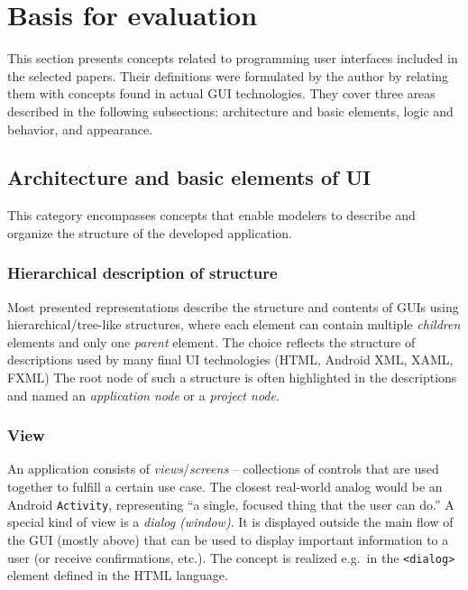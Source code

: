 \section{Basis for evaluation}\label{sec:basis-for-evaluation}

This section presents concepts related to programming user interfaces included in the selected papers.
Their definitions were formulated by the author by relating them with concepts found in actual GUI technologies.
They cover three areas described in the following subsections: architecture and basic elements, logic and behavior, and appearance.

\subsection{Architecture and basic elements of UI}\label{subsec:architecture-and-basic-elements-of-ui}
This category encompasses concepts that enable modelers to describe and organize the structure of the developed application.

\subsubsection{Hierarchical description of structure}
Most presented representations describe the structure and contents of GUIs using hierarchical/tree-like structures, where each element can contain multiple \emph{children} elements and only one \emph{parent} element.
The choice reflects the structure of descriptions used by many final UI technologies (HTML, Android XML, XAML, FXML)
The root node of such a structure is often highlighted in the descriptions and named an \emph{application node} or a \emph{project node}.

\subsubsection{View}
An application consists of \emph{views}/\emph{screens} -- collections of controls that are used together to fulfill a certain use case.
The closest real-world analog would be an Android \texttt{Activity}, representing \enquote{a single, focused thing that the user can do.}
A special kind of view is a \emph{dialog (window)}.
It is displayed outside the main flow of the GUI (mostly above) that can be used to display important information to a user (or receive confirmations, etc.).
The concept is realized e.g.\ in the \texttt{<dialog>} element defined in the HTML language.

